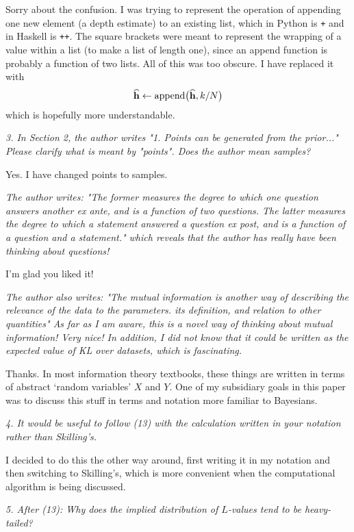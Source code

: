 \documentclass[a4paper, 12pt]{article}
\renewcommand{\quote}{\em}
\begin{document}
Sorry about the confusion. I was trying to represent the operation of
appending one new element (a depth estimate)
to an existing list, which in Python is {\tt +}
and in Haskell is {\tt ++}. The square brackets were meant to represent
the wrapping of a value within a list (to make a list of length one),
since an append function is probably a function of two lists.
All of this was too obscure. I have replaced it with
\begin{align}
\widehat{\mathbf{h}} \leftarrow \textnormal{append}\big(\widehat{\mathbf{h}}, k/N\big)
\end{align}
which is hopefully more understandable.

{\quote
3. In Section 2, the author writes "1. Points can be generated from the prior..."  Please clarify what is meant by "points".  Does the author mean samples?}

Yes. I have changed points to samples.

{\quote
The author writes:
"The former measures the degree to which one question answers another ex ante, and is a function of two questions. The latter measures the degree to which a statement answered a question ex post, and is a function of a question and a statement."
which reveals that the author has really have been thinking about questions!}

I'm glad you liked it!

{\quote
The author also writes:
"The mutual information is another way of describing the relevance of the data to the parameters. its definition, and relation to other quantities"
As far as I am aware, this is a novel way of thinking about mutual information!  Very nice!
In addition, I did not know that it could be written as the expected value of KL over datasets, which is fascinating.}

Thanks. In most information theory textbooks, these things are written in
terms of abstract `random variables' $X$ and $Y$. One of my subsidiary
goals in this paper was to discuss this stuff in terms and notation more
familiar to Bayesians.

{\quote
4. It would be useful to follow (13) with the calculation written in your notation rather than Skilling's.}

I decided to do this the other way around, first writing it in my notation and
then switching to Skilling's, which is more convenient when the computational
algorithm is being discussed.

{\quote
5. After (13): Why does the implied distribution of $L$-values tend to be heavy-tailed?}
\end{document}
